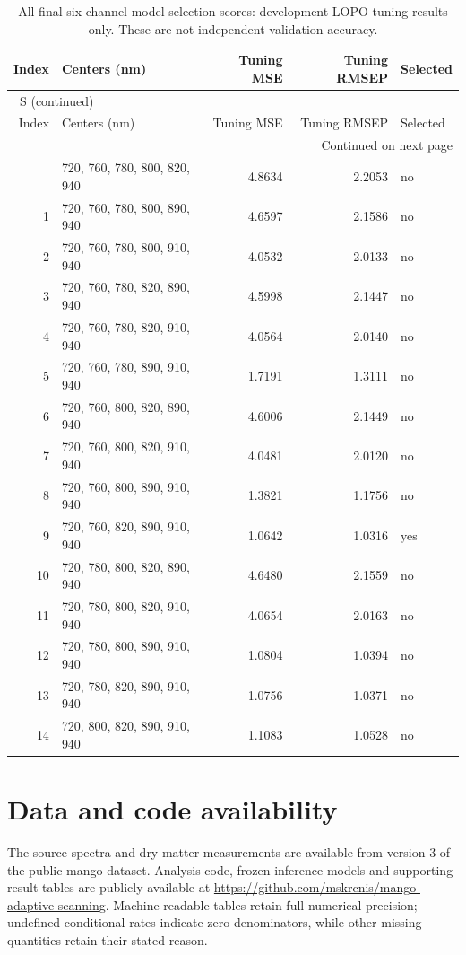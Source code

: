 \documentclass[10pt,a4paper]{article}
\renewcommand{\thetable}{S\arabic{table}}
\begin{document}
\begingroup\small
\setlength{\tabcolsep}{3.5pt}
\renewcommand{\arraystretch}{1.10}
\begin{longtable}{rlrrl}
\caption{All final six-channel model selection scores: development LOPO tuning results only. These are not independent validation accuracy.}\label{tab:candidateselection}\\
\toprule
Index & Centers (nm) & Tuning MSE & Tuning RMSEP & Selected \\
\midrule
\endfirsthead
\multicolumn{5}{l}{\tablename~\thetable{} (continued)}\\
\toprule
Index & Centers (nm) & Tuning MSE & Tuning RMSEP & Selected \\
\midrule
\endhead
\midrule
\multicolumn{5}{r}{Continued on next page}\\
\endfoot
\bottomrule
\endlastfoot
0 & 720, 760, 780, 800, 820, 940 & 4.8634 & 2.2053 & no \\
1 & 720, 760, 780, 800, 890, 940 & 4.6597 & 2.1586 & no \\
2 & 720, 760, 780, 800, 910, 940 & 4.0532 & 2.0133 & no \\
3 & 720, 760, 780, 820, 890, 940 & 4.5998 & 2.1447 & no \\
4 & 720, 760, 780, 820, 910, 940 & 4.0564 & 2.0140 & no \\
5 & 720, 760, 780, 890, 910, 940 & 1.7191 & 1.3111 & no \\
6 & 720, 760, 800, 820, 890, 940 & 4.6006 & 2.1449 & no \\
7 & 720, 760, 800, 820, 910, 940 & 4.0481 & 2.0120 & no \\
8 & 720, 760, 800, 890, 910, 940 & 1.3821 & 1.1756 & no \\
9 & 720, 760, 820, 890, 910, 940 & 1.0642 & 1.0316 & yes \\
10 & 720, 780, 800, 820, 890, 940 & 4.6480 & 2.1559 & no \\
11 & 720, 780, 800, 820, 910, 940 & 4.0654 & 2.0163 & no \\
12 & 720, 780, 800, 890, 910, 940 & 1.0804 & 1.0394 & no \\
13 & 720, 780, 820, 890, 910, 940 & 1.0756 & 1.0371 & no \\
14 & 720, 800, 820, 890, 910, 940 & 1.1083 & 1.0528 & no \\
\end{longtable}
\endgroup

\section{Data and code availability}
The source spectra and dry-matter measurements are available from version 3 of the public mango dataset.\citep{andersondata2024} Analysis code, frozen inference models and supporting result tables are publicly available at \url{https://github.com/mskrcnis/mango-adaptive-scanning}. Machine-readable tables retain full numerical precision; undefined conditional rates indicate zero denominators, while other missing quantities retain their stated reason.



\end{document}
